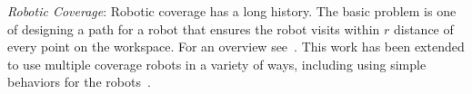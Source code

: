 \noindent \emph{Robotic Coverage}: 
Robotic coverage has a long history. The basic problem is one of designing a path for a robot that ensures the robot visits within $r$ distance of every point on the workspace.  For an overview see~\cite{Choset2001}.  This work has been extended to use multiple coverage robots in a variety of ways, including using simple behaviors for the robots~\cite{spears2006physics,Koenig2001}.
